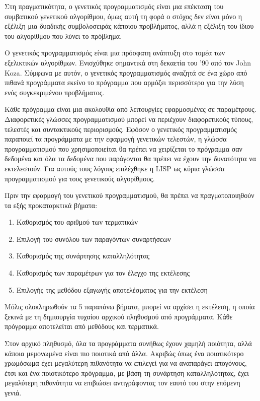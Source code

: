 Στη πραγματικότητα, ο γενετικός προγραμματισμός είναι μια επέκταση του συμβατικού γενετικού αλγορίθμου, όμως αυτή τη φορά ο στόχος δεν είναι μόνο η εξέλιξη μια δυαδικής συμβολοσειράς κάποιου προβλήματος, αλλά η εξέλιξη του ίδιου του αλγορίθμου που λύνει το πρόβλημα.

Ο γενετικός προγραμματισμός είναι μια πρόσφατη ανάπτυξη στο τομέα των εξελικτικών αλγορίθμων. Ενισχύθηκε σημαντικά στη δεκαετία του '90 από τον John Koza.
Σύμφωνα με αυτόν, ο γενετικός προγραμματισμός αναζητά σε ένα χώρο από πιθανά προγράμματα εκείνο το πρόγραμμα που αρμόζει περισσότερο για την λύση ενός συγκεκριμένου προβλήματος.

Κάθε πρόγραμμα είναι μια ακολουθία από λειτουργίες εφαρμοσμένες σε παραμέτρους. Διαφορετικές γλώσσες προγραμματισμού μπορεί να περιέχουν διαφορετικούς τύπους, τελεστές και συντακτικούς περιορισμούς. Εφόσον ο γενετικός προγραμματισμός παραποιεί τα προγράμματα με την εφαρμογή γενετικών τελεστών, η γλώσσα προγραμματισμού που χρησιμοποιείται θα πρέπει να χειρίζεται το πρόγραμμα σαν δεδομένα και όλα τα δεδομένα που παράγονται θα πρέπει να έχουν την δυνατότητα να εκτελεστούν. Για αυτούς τους λόγους επιλέχθηκε η LISP ως κύρια γλώσσα προγραμματισμού για τους γενετικούς αλγορίθμους.

Πριν την εφαρμογή του γενετικού προγραμματισμού, θα πρέπει να πραγματοποιηθούν τα εξής προκαταρκτικά βήματα:

\begin{enumerate}
  \item Καθορισμός του αριθμού των τερματικών
  \item Επιλογή του συνόλου των παραγόντων συναρτήσεων
  \item Καθορισμός της συνάρτησης καταλληλότητας
  \item Καθορισμός των παραμέτρων για τον έλεγχο της εκτέλεσης
  \item Επιλογής της μεθόδου εξαγωγής αποτελέσματος για την εκτέλεση
\end{enumerate}

Μόλις ολοκληρωθούν τα 5 παραπάνω βήματα, μπορεί να αρχίσει η εκτέλεση, η οποία ξεκινά με τη δημιουργία τυχαίου αρχικού πληθυσμού από προγράμματα. Κάθε πρόγραμμα αποτελείται από μεθόδους και τερματικά.

Στον αρχικό πληθυσμό, όλα τα προγράμματα συνήθως έχουν χαμηλή ποιότητα, αλλά κάποια μεμονωμένα είναι πιο ποιοτικά από άλλα. Ακριβώς όπως ένα ποιοτικότερο χρωμόσωμα έχει μεγαλύτερη πιθανότητα να επιλεγεί για να αναπαράγει απογόνους, έτσι και ένα ποιοτικότερο πρόγραμμα, με βάση τη συνάρτηση καταλληλότητας, έχει μεγαλύτερη πιθανότητα να επιβιώσει αντιγράφοντας τον εαυτό του στην επόμενη γενιά.

